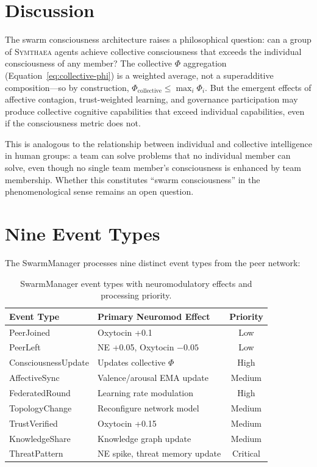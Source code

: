 \documentclass[12pt]{book}
\newcommand{\symthaea}{\textsc{Symthaea}}
\begin{document}
\section{Discussion}

The swarm consciousness architecture raises a philosophical question: can a group of \symthaea{} agents achieve collective consciousness that exceeds the individual consciousness of any member? The collective $\Phi$ aggregation (Equation~\ref{eq:collective-phi}) is a weighted average, not a superadditive composition---so by construction, $\Phi_{\text{collective}} \leq \max_i \Phi_i$. But the emergent effects of affective contagion, trust-weighted learning, and governance participation may produce collective cognitive capabilities that exceed individual capabilities, even if the consciousness metric does not.

This is analogous to the relationship between individual and collective intelligence in human groups: a team can solve problems that no individual member can solve, even though no single team member's consciousness is enhanced by team membership. Whether this constitutes ``swarm consciousness'' in the phenomenological sense remains an open question.

\section{Nine Event Types}

The SwarmManager processes nine distinct event types from the peer network:

\begin{table}[H]
\centering
\caption{SwarmManager event types with neuromodulatory effects and processing priority.}
\label{tab:swarm-events}
\begin{tabular}{llc}
\toprule
\textbf{Event Type} & \textbf{Primary Neuromod Effect} & \textbf{Priority} \\
\midrule
PeerJoined & Oxytocin +0.1 & Low \\
PeerLeft & NE +0.05, Oxytocin $-0.05$ & Low \\
ConsciousnessUpdate & Updates collective $\Phi$ & High \\
AffectiveSync & Valence/arousal EMA update & Medium \\
FederatedRound & Learning rate modulation & High \\
TopologyChange & Reconfigure network model & Medium \\
TrustVerified & Oxytocin +0.15 & Medium \\
KnowledgeShare & Knowledge graph update & Medium \\
ThreatPattern & NE spike, threat memory update & Critical \\
\bottomrule
\end{tabular}
\end{table}
\end{document}
